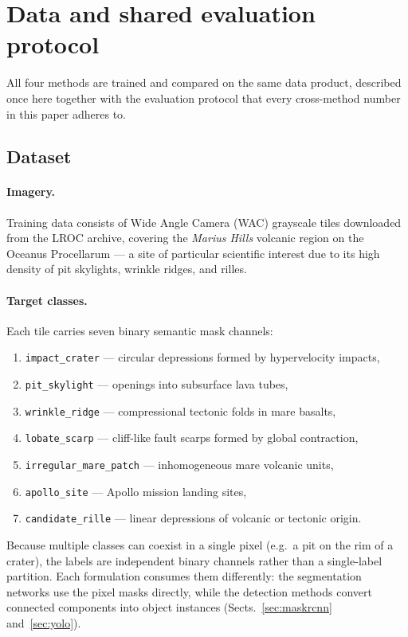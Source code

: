 \section{Data and shared evaluation protocol}
\label{sec:mr_dataset}

All four methods are trained and compared on the same data product, described once here together with the evaluation protocol that every cross-method number in this paper adheres to.

\subsection{Dataset}

\paragraph{Imagery.}
Training data consists of Wide Angle Camera (WAC) grayscale tiles downloaded from the LROC archive, covering the \textit{Marius Hills} volcanic region on the Oceanus Procellarum --- a site of particular scientific interest due to its high density of pit skylights, wrinkle ridges, and rilles.

\paragraph{Target classes.}
Each tile carries seven binary semantic mask channels:
\begin{enumerate}
    \item \texttt{impact\_crater} --- circular depressions formed by hypervelocity impacts,
    \item \texttt{pit\_skylight} --- openings into subsurface lava tubes,
    \item \texttt{wrinkle\_ridge} --- compressional tectonic folds in mare basalts,
    \item \texttt{lobate\_scarp} --- cliff-like fault scarps formed by global contraction,
    \item \texttt{irregular\_mare\_patch} --- inhomogeneous mare volcanic units,
    \item \texttt{apollo\_site} --- Apollo mission landing sites,
    \item \texttt{candidate\_rille} --- linear depressions of volcanic or tectonic origin.
\end{enumerate}
Because multiple classes can coexist in a single pixel (e.g.\ a pit on the rim of a crater), the labels are independent binary channels rather than a single-label partition. Each formulation consumes them differently: the segmentation networks use the pixel masks directly, while the detection methods convert connected components into object instances (Sects.~\ref{sec:maskrcnn} and~\ref{sec:yolo}).

